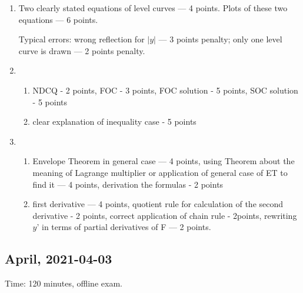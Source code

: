 \begin{enumerate}
        \item Two clearly stated equations of level curves — 4 points. Plots of these two equations — 6 points.
        
        Typical errors: wrong reflection for $|y|$ — 3 points penalty; only one level curve is drawn — 2 points penalty.
        
        \item 
        \begin{enumerate}
            \item NDCQ - 2 points, FOC - 3 points, FOC solution - 5 points, SOC solution - 5 points
            \item clear explanation of inequality case - 5 points
        \end{enumerate}
        \item
        \begin{enumerate}
            \item Envelope Theorem in general case — 4 points, using Theorem about the meaning of Lagrange multiplier or application of general case of ET to find it — 4 points, derivation the formulas - 2 points
            \item  first derivative — 4 points, quotient rule for calculation of the second derivative - 2 points, correct application of chain rule - 2points, rewriting $y’$ in terms of partial derivatives of F — 2 points.
        \end{enumerate}

\end{enumerate}



\subsection{April, 2021-04-03}

Time: 120 minutes, offline exam. 

